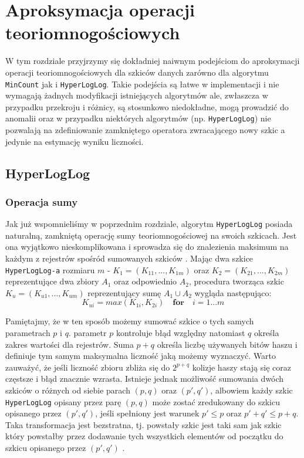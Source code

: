 \chapter{Aproksymacja operacji teoriomnogościowych}
\thispagestyle{chapterBeginStyle}

W tym rozdziale przyjrzymy się dokładniej naiwnym podejściom do aproksymacji operacji teoriomnogościowych dla szkiców danych zarówno dla algorytmu \texttt{MinCount} jak i \texttt{HyperLogLog}. Takie podejścia są łatwe w implementacji i nie wymagają żadnych modyfikacji istniejących algorytmów ale, zwłaszcza w przypadku przekroju i różnicy, są stosunkowo niedokładne, mogą prowadzić do anomalii oraz w przypadku niektórych algorytmów (np. \texttt{HyperLogLog}) nie pozwalają na zdefiniowanie zamkniętego operatora zwracającego nowy szkic a jedynie na estymację wyniku liczności.

\section{HyperLogLog}

\subsection{Operacja sumy}

Jak już wspomnieliśmy w poprzednim rozdziale, algorytm \texttt{HyperLogLog} posiada naturalną, zamkniętą operację sumy teoriomnogościowej na swoich szkicach. Jest ona wyjątkowo nieskomplikowana i sprowadza się do znalezienia maksimum na każdym z rejestrów spośród sumowanych szkiców \cite{oertl}. Mając dwa szkice \texttt{HyperLogLog-a} rozmiaru $m$ - $K_1 = (K_{11}, ..., K_{1m})$ oraz $K_2 = (K_{21}, ..., K_{2m})$ reprezentujące dwa zbiory $A_1$ oraz odpowiednio $A_2$, procedura tworząca szkic $K_u = (K_{u1}, ..., K_{um})$ reprezentujący sumę $A_1 \cup A_2$ wygląda następująco:
\begin{equation}
    K_{ui} = max(K_{1i}, K_{2i}) \quad \textbf{for} \quad i = 1 ... m
\end{equation}

Pamiętajmy, że w ten sposób możemy sumować szkice o tych samych parametrach $p$ i $q$. parametr $p$ kontroluje błąd względny natomiast $q$ określa zakres wartości dla rejestrów. Suma $p + q$ określa liczbę używanych bitów haszu i definiuje tym samym maksymalna liczność jaką możemy wyznaczyć. Warto zauważyć, że jeśli liczność zbioru zbliża się do $2^{p+q}$ kolizje haszy stają się coraz częstsze i błąd znacznie wzrasta. Istnieje jednak możliwość sumowania dwóch szkiców o różnych od siebie parach $(p, q)$ oraz $(p',q')$, albowiem każdy szkic \texttt{HyperLogLog} opisany przez parę $(p, q)$ może zostać zredukowany do szkicu opisanego przez $(p',q')$, jeśli spełniony jest warunek $p' \leq p$ oraz $p' + q' \leq p + q$. Taka transformacja jest bezstratna, tj. powstały szkic jest taki sam jak szkic który powstałby przez dodawanie tych wszystkich elementów od początku do szkicu opisanego przez $(p', q')$ \cite{oertl}.

